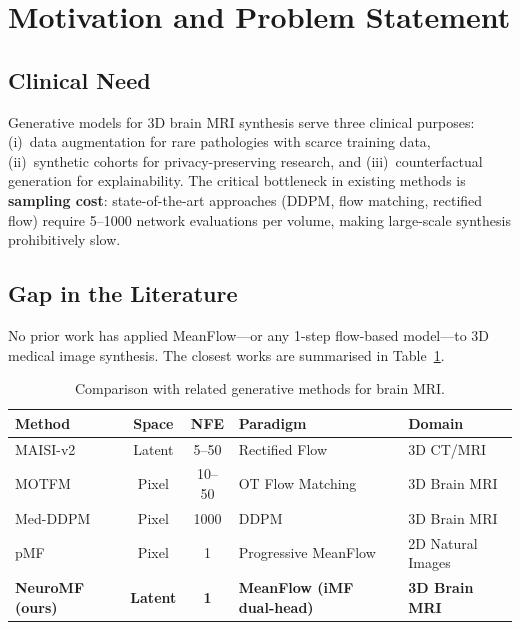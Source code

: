 \section{Motivation and Problem Statement}
\label{sec:motivation}

\subsection{Clinical Need}

Generative models for 3D brain MRI synthesis serve three clinical purposes:
(i)~data augmentation for rare pathologies with scarce training data,
(ii)~synthetic cohorts for privacy-preserving research, and
(iii)~counterfactual generation for explainability.
The critical bottleneck in existing methods is \textbf{sampling cost}:
state-of-the-art approaches (DDPM, flow matching, rectified flow)
require 5--1000 network evaluations per volume, making large-scale synthesis
prohibitively slow.

\subsection{Gap in the Literature}

No prior work has applied MeanFlow---or any 1-step flow-based model---to 3D
medical image synthesis. The closest works are summarised in
Table~\ref{tab:literature}.

\begin{table}[ht]
\centering
\caption{Comparison with related generative methods for brain MRI.}
\label{tab:literature}
\begin{tabular}{lccll}
\toprule
\textbf{Method} & \textbf{Space} & \textbf{NFE} & \textbf{Paradigm} & \textbf{Domain} \\
\midrule
MAISI-v2 \cite{maisi_v2}    & Latent & 5--50   & Rectified Flow       & 3D CT/MRI \\
MOTFM \cite{motfm}          & Pixel  & 10--50  & OT Flow Matching     & 3D Brain MRI \\
Med-DDPM \cite{medddpm}     & Pixel  & 1000    & DDPM                 & 3D Brain MRI \\
pMF \cite{pmf}              & Pixel  & 1       & Progressive MeanFlow & 2D Natural Images \\
\textbf{NeuroMF (ours)}     & \textbf{Latent} & \textbf{1} & \textbf{MeanFlow (iMF dual-head)} & \textbf{3D Brain MRI} \\
\bottomrule
\end{tabular}
\end{table}

